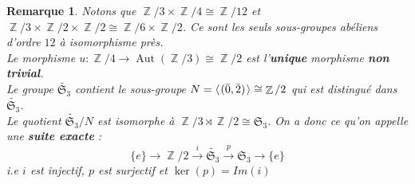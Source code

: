 \documentclass[a4paper, oneside]{report}
\theoremstyle{break}
\newtheorem{remar}[thm]{Remarque}
\newcommand{\isom}{isomorphisme }
\newcommand{\sg}{sous-groupe }
\newcommand{\sgs}{sous-groupes }
\newcommand{\x}{\times}
\DeclareMathOperator{\Z}{\mathbb{Z}}
\renewcommand{\S}{\mathfrak{S}}
\DeclareMathOperator{\Aut}{Aut}
\newcommand{\pro}[1]{\langle\hspace{0.1em}#1\hspace{0.1em}\rangle}
\newcommand{\gen}{\pro}
\begin{document}
\begin{remar}
Notons que $\Z/3 \times \Z/4 \cong \Z/12$ et $\Z/3 \times \Z/2 \times \Z/2 \cong \Z/6 \x \Z/2$. Ce sont les seuls \sgs abéliens d'ordre $12$ à \isom près.\\
Le morphisme $u: \Z/4 \rightarrow \Aut(\Z/3)\cong \Z/2$ est l'\textbf{unique} morphisme \textbf{non trivial}.\\
Le groupe $\tilde{\S_3}$ contient le \sg $N=\gen{(\bar{0}, \bar{2})} \cong \Z/2$ qui est distingué dans $\tilde{\S_3}$.\\
Le quotient $\tilde{\S_3}/N$ est isomorphe à $\Z/3 \rtimes \Z/2 \cong\S_3$. On a donc ce qu'on appelle une \textbf{suite exacte} :
$$\{e\} \rightarrow \Z/2 \overset{i}{\rightarrow} \tilde{\S_3} \overset{p}{\rightarrow} \S_3 \rightarrow \{e\}$$
i.e $i$ est injectif, $p$ est surjectif et $\ker (p)= Im(i)$
\end{remar}
\end{document}
